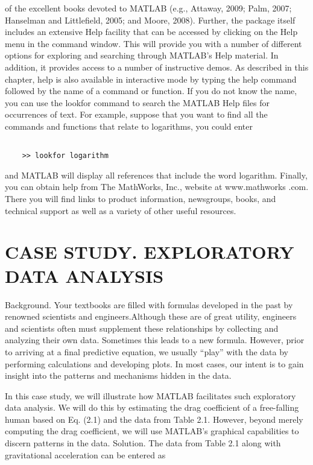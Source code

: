 \documentclass[../main.tex]{subfiles}
\begin{document}
of the excellent books devoted to MATLAB (e.g., Attaway, 2009; Palm, 2007; Hanselman
and Littlefield, 2005; and Moore, 2008).
Further, the package itself includes an extensive Help facility that can be accessed by
clicking on the Help menu in the command window. This will provide you with a number
of different options for exploring and searching through MATLAB’s Help material. In addition, it provides access to a number of instructive demos.
As described in this chapter, help is also available in interactive mode by typing the
help command followed by the name of a command or function.
If you do not know the name, you can use the lookfor command to search the
MATLAB Help files for occurrences of text. For example, suppose that you want to find all
the commands and functions that relate to logarithms, you could enter
\begin{lstlisting}[frame=none, numbers=none]

	>> lookfor logarithm

\end{lstlisting}
and MATLAB will display all references that include the word logarithm.
Finally, you can obtain help from The MathWorks, Inc., website at www.mathworks
.com. There you will find links to product information, newsgroups, books, and technical
support as well as a variety of other useful resources.

\section{CASE STUDY. EXPLORATORY DATA ANALYSIS}


Background. Your textbooks are filled with formulas developed in the past by
renowned scientists and engineers.Although these are of great utility, engineers and scientists
often must supplement these relationships by collecting and analyzing their own data. Sometimes this leads to a new 
formula. However, prior to arriving at a final predictive equation, we
usually “play” with the data by performing calculations and developing plots. In most cases,
our intent is to gain insight into the patterns and mechanisms hidden in the data.


In this case study, we will illustrate how MATLAB facilitates such exploratory data
analysis. We will do this by estimating the drag coefficient of a free-falling human based on
Eq. (2.1) and the data from Table 2.1. However, beyond merely computing the drag
coefficient, we will use MATLAB’s graphical capabilities to discern patterns in the data.
Solution. The data from Table 2.1 along with gravitational acceleration can be entered as
\end{document}

